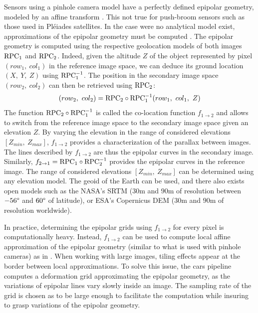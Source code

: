 Sensors using a pinhole camera model have a perfectly defined epipolar geometry, modeled by an affine transform \cite{hartley_multiple_2004}. This not true for push-broom sensors \cite{morgan_epipolar_2004} such as those used in Pléiades satellites. In the case were no analytical model exist, approximations of the epipolar geometry must be computed \cite{oh_piecewise_2010, koh_unified_2016, michel_new_2020}. The epipolar geometry is computed using the respective geolocation models of both images $\mathrm{RPC}_1$ and $\mathrm{RPC}_2$. Indeed, given the altitude $Z$ of the object represented by pixel $(row_1, ~col_1)$ in the reference image space, we can deduce its ground location $(X, ~Y, ~Z)$ using $\mathrm{RPC}_1^{-1}$. The position in the secondary image space $(row_2,~col_2)$ can then be retrieved using $\mathrm{RPC}_2$: 
\begin{equation}
    (row_2,~col_2) = \mathrm{RPC}_2\circ\mathrm{RPC}_1^{-1}(row_1, ~col_1, ~Z)\label{eq:epipolar_transfer}
\end{equation}
The function $\mathrm{RPC}_2\circ\mathrm{RPC}_1^{-1}$ is called the co-location function $f_{1\rightarrow 2}$ and allows to switch from the reference image space to the secondary image space given an elevation $Z$. By varying the elevation in the range of considered elevations $[Z_{min},~Z_{max}]$, $f_{1\rightarrow 2}$ provides a characterization of the parallax between images. The lines described by $f_{1\rightarrow 2}$ are thus the epipolar curves in the secondary image. Similarly, $f_{2\rightarrow 1}=\mathrm{RPC}_1\circ\mathrm{RPC}_2^{-1}$ provides the epipolar curves in the reference image. The range of considered elevations $[Z_{min},~Z_{max}]$ can be determined using any elevation model. The geoid of the Earth can be used, and there also exists open models such as the NASA's SRTM \cite{farr_shuttle_2007} ($30$m and $90$m of resolution between $-56\degree$ and $60\degree$ of latitude), or ESA's Copernicus DEM ($30$m and $90$m of resolution worldwide).

In practice, determining the epipolar grids using $f_{1\rightarrow 2}$ for every pixel is computationally heavy. Instead, $f_{1\rightarrow 2}$ can be used to compute local affine approximation of the epipolar geometry (similar to what is used with pinhole cameras) as in \cite{de_franchis_stereo-rectification_2014}. When working with large images, tiling effects appear at the border between local approximations. To solve this issue, the \acrshort{cars} pipeline computes a deformation grid approximating the epipolar geometry, as the variations of epipolar lines vary slowly inside an image. The sampling rate of the grid is chosen as to be large enough to facilitate the computation while insuring to grasp variations of the epipolar geometry.

